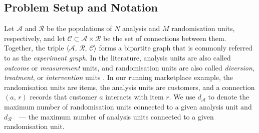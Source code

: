 \documentclass[sigconf,nonacm]{acmart}
\begin{document}
\subsection{Problem Setup and Notation}\label{subsec:notation}

Let $\mathcal A$ and $\mathcal R$ be the populations of $N$ analysis and $M$ randomisation units, respectively, and let $\mathcal C\subset \mathcal A \times \mathcal R$ be the set of connections between them. Together, the triple $\langle \mathcal A,\,\mathcal R,\,\mathcal C\rangle$ forms a bipartite graph that is commonly referred to as the \emph{experiment graph}. In the literature, analysis units are also called \emph{outcome} or \emph{measurement} units, and randomisation units are also called \emph{diversion}, \emph{treatment}, or \emph{intervention} units \cite{zigler2021bipartite,harshaw2023erl,doudchenko2020causal,tan2025estimating}. In our running marketplace example, the randomisation units are items, the analysis units are customers, and a connection $(a,\,r)$ records that customer $a$ interacts with item $r$. We use $d_\mathcal{A}$ to denote the maximum number of randomisation units connected to a given analysis unit and $d_\mathcal{R}$~~---  the maximum number of analysis units connected to a given randomisation unit.
\end{document}
